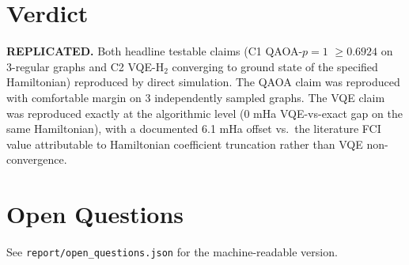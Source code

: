 \documentclass[11pt]{article}
\begin{document}
\section{Verdict}
\textbf{REPLICATED.} Both headline testable claims (C1 QAOA-$p{=}1$
$\ge 0.6924$ on 3-regular graphs and C2 VQE-$\mathrm{H_2}$ converging to
ground state of the specified Hamiltonian) reproduced by direct simulation.
The QAOA claim was reproduced with comfortable margin on 3 independently
sampled graphs. The VQE claim was reproduced exactly at the algorithmic level
(0 mHa VQE-vs-exact gap on the same Hamiltonian), with a documented 6.1 mHa
offset vs.\ the literature FCI value attributable to Hamiltonian coefficient
truncation rather than VQE non-convergence.

\section{Open Questions}
See \texttt{report/open\_questions.json} for the machine-readable version.
\end{document}
